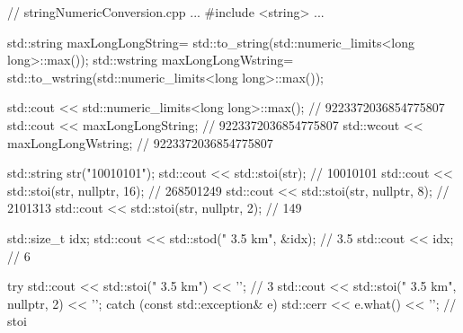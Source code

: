 \begin{cpp}
// stringNumericConversion.cpp
...
#include <string>
...

std::string maxLongLongString=
			std::to_string(std::numeric_limits<long long>::max());
std::wstring maxLongLongWstring=
			std::to_wstring(std::numeric_limits<long long>::max());

std::cout << std::numeric_limits<long long>::max(); // 9223372036854775807
std::cout << maxLongLongString; // 9223372036854775807
std::wcout << maxLongLongWstring; // 9223372036854775807

std::string str("10010101");
std::cout << std::stoi(str); // 10010101
std::cout << std::stoi(str, nullptr, 16); // 268501249
std::cout << std::stoi(str, nullptr, 8); // 2101313
std::cout << std::stoi(str, nullptr, 2); // 149

std::size_t idx;
std::cout << std::stod(" 3.5 km", &idx); // 3.5
std::cout << idx; // 6

try{
	std::cout << std::stoi(" 3.5 km") << '\n'; // 3
	std::cout << std::stoi(" 3.5 km", nullptr, 2) << '\n';
}
catch (const std::exception& e){
	std::cerr << e.what() << '\n';
} // stoi
\end{cpp}














